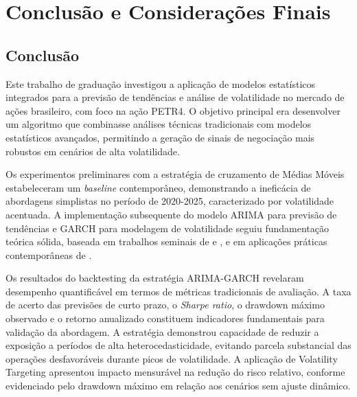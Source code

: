 \chapter{Conclusão e Considerações Finais}

\section{Conclusão}

Este trabalho de graduação investigou a aplicação de modelos estatísticos integrados para a previsão de tendências e análise de volatilidade no mercado de ações brasileiro, com foco na ação PETR4. O objetivo principal era desenvolver um algoritmo que combinasse análises técnicas tradicionais com modelos estatísticos avançados, permitindo a geração de sinais de negociação mais robustos em cenários de alta volatilidade.

\par

Os experimentos preliminares com a estratégia de cruzamento de Médias Móveis estabeleceram um \textit{baseline} contemporâneo, demonstrando a ineficácia de abordagens simplistas no período de 2020-2025, caracterizado por volatilidade acentuada. A implementação subsequente do modelo ARIMA para previsão de tendências e GARCH para modelagem de volatilidade seguiu fundamentação teórica sólida, baseada em trabalhos seminais de  e , e em aplicações práticas contemporâneas de .

\par

Os resultados do backtesting da estratégia ARIMA-GARCH revelaram desempenho quantificável em termos de métricas tradicionais de avaliação. A taxa de acerto das previsões de curto prazo, o \textit{Sharpe ratio}, o drawdown máximo observado e o retorno anualizado constituem indicadores fundamentais para validação da abordagem. A estratégia demonstrou capacidade de reduzir a exposição a períodos de alta heterocedasticidade, evitando parcela substancial das operações desfavoráveis durante picos de volatilidade. A aplicação de Volatility Targeting apresentou impacto mensurável na redução do risco relativo, conforme evidenciado pelo drawdown máximo em relação aos cenários sem ajuste dinâmico.

